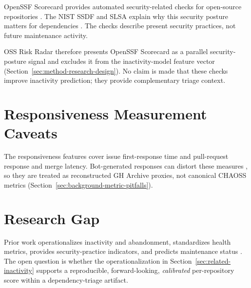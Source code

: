 OpenSSF Scorecard provides automated security-related checks for open-source
repositories \cite{zahan2023scorecard}. The NIST SSDF and SLSA explain why this
security posture matters for dependencies
\cite{souppaya2022ssdf,slsa2025spec}. The checks describe present security
practices, not future maintenance activity.

OSS Risk Radar therefore presents OpenSSF Scorecard as a parallel
security-posture signal and excludes it from the inactivity-model feature vector
(Section~\ref{sec:method-research-design}). No claim is made that these checks
improve inactivity prediction; they provide complementary triage context.

\section{Responsiveness Measurement Caveats}
\label{sec:related-responsiveness}

The responsiveness features cover issue first-response time and pull-request
response and merge latency. Bot-generated responses can distort these measures
\cite{hasan2023firstresponse}, so they are treated as reconstructed GH Archive
proxies, not canonical CHAOSS metrics
(Section~\ref{sec:background-metric-pitfalls}).

\section{Research Gap}
\label{sec:related-summary}

Prior work operationalizes inactivity and abandonment, standardizes health
metrics, provides security-practice indicators, and predicts maintenance status
\cite{coelho2018identifying,coelho2020maintained,li2022ossara}. The open question
is whether the operationalization in Section~\ref{sec:related-inactivity}
supports a reproducible, forward-looking, \emph{calibrated} per-repository score
within a dependency-triage artifact.
